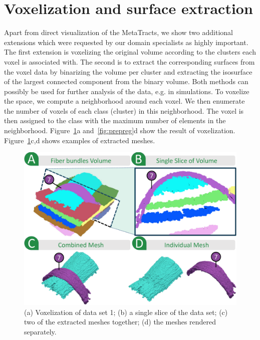 \section {Voxelization and surface extraction}
\label{sec:vis}

Apart from direct visualization of the MetaTracts, we show two additional extensions which were requested by our domain specialists as highly important. The first extension is voxelizing the original volume according to the clusters each voxel is associated with.
The second is to extract the corresponding surfaces from the voxel data by binarizing the volume per cluster and extracting the isosurface of the largest connected component from the binary volume. Both methods can possibly be used for further analysis of the data, e.g. in simulations.
%
To voxelize the space,  we compute a neighborhood around each voxel. We then enumerate the number of voxels of each class (cluster) in this neighborhood. The voxel is then assigned to the class with the maximum number of elements in the neighborhood. Figure~\ref{fig:crop-16-decomp}a and~\ref{fig:prepreg}d show the result of voxelization. Figure~\ref{fig:crop-16-decomp}c,d shows examples of extracted meshes.

\begin{figure}
\centering
		\includegraphics[width=\linewidth]{images_pvis/figure8.pdf}
		 \vspace{-1.5em}
	\caption{(a) Voxelization of data set 1; (b) a single slice of the data set; (c) two of the extracted meshes together; (d) the meshes rendered separately.}
	\label{fig:crop-16-decomp}
\end{figure}  



